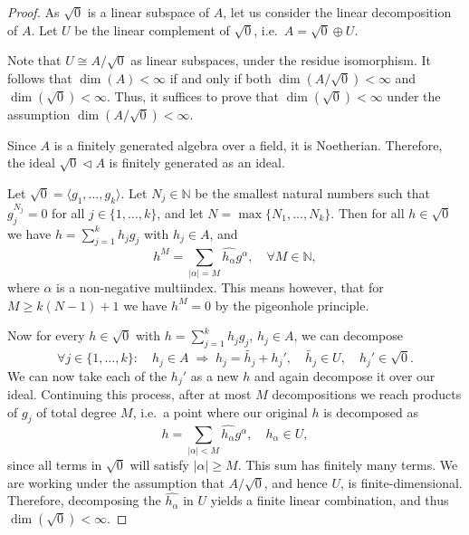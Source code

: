 \documentclass[10pt,a4paper]{amsart}
\begin{document}
\begin{proof}
As $\sqrt{0}$ is a linear subspace of $A$, let us consider the linear decomposition of $A$. Let $U$ be the linear complement of $\sqrt{0}$, i.e.~$A = \sqrt{0} \oplus U$. 

Note that $U \cong A/\sqrt{0}$ as linear subspaces, under the residue isomorphism. It follows that $\dim(A) < \infty$ if and only if both $\dim(A/\sqrt{0}) < \infty$ and $\dim(\sqrt{0}) < \infty$. Thus, it suffices to prove that $\dim(\sqrt{0}) < \infty$ under the assumption $\dim(A/\sqrt{0}) < \infty$.

Since $A$ is a finitely generated algebra over a field, it is Noetherian. Therefore, the ideal $\sqrt{0} \triangleleft A$ is finitely generated as an ideal.

Let $\sqrt{0} = \langle g_1, \ldots, g_k\rangle$. Let $N_j \in \mathbb{N}$ be the smallest natural numbers such that $g_j^{N_j} = 0$ for all $j \in \{1, \ldots, k\}$, and let $N = \max\{N_1, \ldots, N_k\}$. Then for all $h \in \sqrt{0}$ we have $h = \sum_{j=1}^k h_j g_j$ with $h_j \in A$, and
\[
h^M = \sum_{|\alpha|=M} \widehat{h_\alpha} g^\alpha, \quad \forall M \in \mathbb{N},
\]
where $\alpha$ is a non-negative multiindex. This means however, that for $M \geq k(N-1)+1$ we have $h^M = 0$ by the pigeonhole principle.

Now for every $h \in \sqrt{0}$ with $h = \sum_{j=1}^k h_j g_j$, $h_j \in A$, we can decompose
\[
\forall j \in \{1, \ldots, k\}: \quad h_j \in A \;\Rightarrow\; h_j = \widetilde{h_j} + h_j', \quad
\widetilde{h_j} \in U, \quad h_j' \in \sqrt{0}.
\]
We can now take each of the $h_j'$ as a new $h$ and again decompose it over our ideal. Continuing this process, after at most $M$ decompositions we reach products of $g_j$ of total degree $M$, i.e.~a point where our original $h$ is decomposed as 
\[
h = \sum_{|\alpha| < M} \widehat{h_\alpha} g^{\alpha}, \quad \widehat{h_\alpha} \in U,
\]
since all terms in $\sqrt{0}$ will satisfy $|\alpha| \geq M$. This sum has finitely many terms. We are working under the assumption that $A/\sqrt{0}$, and hence $U$, is finite-dimensional. Therefore, decomposing the $\widehat{h_\alpha}$ in $U$ yields a finite linear combination, and thus $\dim(\sqrt{0}) < \infty$.
\end{proof}
\end{document}
